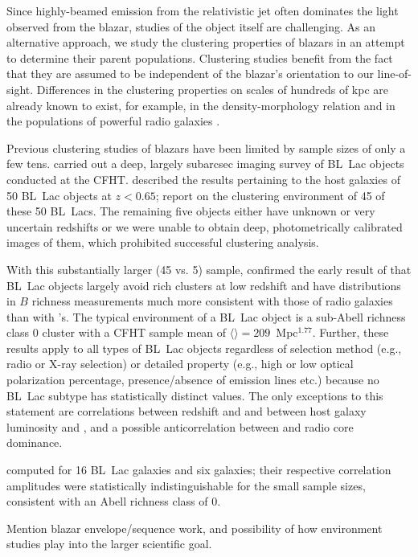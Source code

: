 \documentclass{emulateapj}
\begin{document}
Since highly-beamed emission from the relativistic jet often dominates the light observed from the blazar, studies of the object itself are challenging. As an alternative approach, we study the clustering properties of blazars in an attempt to determine their parent populations. Clustering studies benefit from the fact that they are assumed to be independent of the blazar's orientation to our line-of-sight. Differences in the clustering properties on scales of hundreds of kpc are already known to exist, for example, in the density-morphology relation \citep{dre80} and in the populations of powerful radio galaxies \citep{pre88}. 

Previous clustering studies of blazars have been limited by sample sizes of only a few tens. \citet{wur97} carried out a deep, largely subarcsec imaging survey of BL~Lac objects conducted at the CFHT. \citet{wur93} described the results pertaining to the host galaxies of 50 BL~Lac objects at $z<0.65$; \citet{wur97} report on the clustering environment of 45 of these 50 BL~Lacs. The remaining five objects either have unknown or very uncertain redshifts or we were unable to obtain deep, photometrically calibrated images of them, which prohibited successful clustering analysis.  

With this substantially larger (45 vs. 5) sample, \citet{wur97} confirmed the early result of \citet{pre88} that BL~Lac objects largely avoid rich clusters at low redshift and have distributions in $B$ richness measurements much more consistent with those of \FRII{} radio galaxies than with \FRI{}'s.  The typical environment of a BL~Lac object is a sub-Abell richness class 0 cluster with a CFHT sample mean of $\langle$\bgb$\rangle=209$~Mpc$^{1.77}$. Further, these results apply to all types of BL~Lac objects regardless of selection method (e.g., radio or X-ray selection) or detailed property (e.g., high or low optical polarization percentage, presence/absence of emission lines etc.) because no BL~Lac subtype has statistically distinct \bgb{} values. The only exceptions to this statement are correlations between redshift and \bgb{} and between host galaxy luminosity and \bgb{}, and a possible anticorrelation between \bgb{} and radio core dominance. 

\citet{smi95} computed \bgb{} for 16 BL~Lac galaxies and six \FRI{} galaxies; their respective correlation amplitudes were statistically indistinguishable for the small sample sizes, consistent with an Abell richness class of 0. 

{\note Mention blazar envelope/sequence work, and possibility of how environment studies play into the larger scientific goal.}
\end{document}
